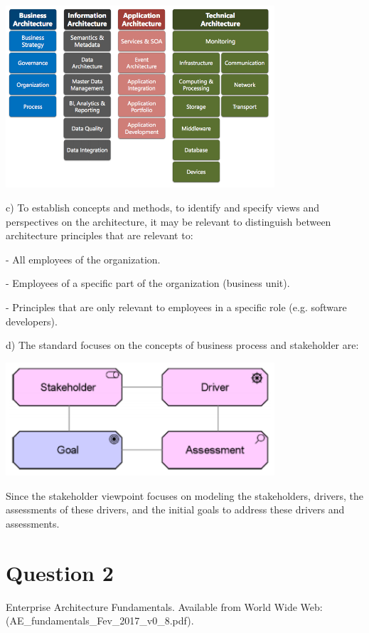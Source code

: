 \documentclass[a4paper,12pt]{texDoc}
\begin{document}
\begin{center}
\includegraphics[width=0.75\textwidth]{concepts.png}
\end{center}

c) To establish concepts and methods, to identify and specify views and perspectives on the architecture, it may be relevant to distinguish between architecture principles that are relevant to:

- All employees of the organization.

- Employees of a specific part of the organization (business unit).

- Principles that are only relevant to employees in a specific role (e.g. software developers).

d) The standard focuses on the concepts of business process and stakeholder are:

\begin{center}
\includegraphics[width=0.75\textwidth]{stakeholders.png}
\end{center}

Since the stakeholder viewpoint focuses on modeling the stakeholders, drivers, the assessments of these drivers, and the initial goals to address these drivers and assessments.

\section*{Question 2}



\begin{thebibliography}{9}
  Enterprise Architecture Fundamentals. Available from World Wide Web: (AE\_fundamentals\_Fev\_2017\_v0\_8.pdf).
\end{thebibliography}

\end{document}
